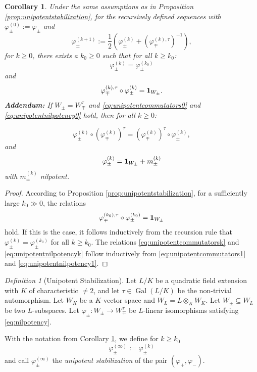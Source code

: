 \documentclass[a4paper,12pt,reqno]{amsart}
\DeclareMathOperator{\Gal}{\mathrm {Gal}}
\theoremstyle{plain}
\newtheorem{corollary}[theorem]{Corollary}
\theoremstyle{remark}
\newtheorem{definition}[theorem]{Definition}
\begin{document}
    \begin{corollary}\label{cor:unipotentstabilization}
      Under the same assumptions as in Proposition \ref{prop:unipotentstabilization}, for the recursively defined sequences with $\varphi^{(0)}_\pm := \varphi_\pm$ and
      \begin{equation}
        \varphi^{(k+1)}_\pm := \frac{1}{2}\left(\varphi_\pm^{(k)}+\left(\varphi_\mp^{(k),\tau}\right)^{-1}\right),
      \end{equation}
      for $k \ge 0$, there exists a $k_0 \ge 0$ such that for all $k \ge k_0$:
      \[
      \varphi_\pm^{(k)}=\varphi_{\pm}^{(k_0)}\]
      and
      \begin{equation}
        \varphi_\mp^{(k),\tau}\circ\varphi_\pm^{(k)}={\bf1}_{W_\pm}.
        \label{eq:conjugateinverse}
      \end{equation}
      \noindent\textbf{Addendum:} If $W_\pm = W_\mp^\tau$ and \eqref{eq:unipotentcommutators0} and \eqref{eq:unipotentnilpotency0} hold, then for all $k \ge 0$:
      
      \begin{equation}
      \varphi_\pm^{(k)}\circ\left(\varphi_\mp^{(k)}\right)^\tau=\left(\varphi_\mp^{(k)}\right)^\tau\circ\varphi_{\pm}^{(k)},
        \label{eq:unipotentcommutatorsk}
      \end{equation}
      and
      \begin{equation}
        \varphi_{\pm}^{(k)}={\bf1}_{W_\pm}+m_\pm^{(k)}
        \label{eq:unipotentnilpotencyk}
      \end{equation}
      with $m_\pm^{(k)}$ nilpotent.
    \end{corollary}

    \begin{proof}
      According to Proposition \ref{prop:unipotentstabilization}, for a sufficiently large $k_0 \gg 0$, the relations
      \[
      \varphi_\mp^{(k_0),\tau}\circ\varphi_\pm^{(k_0)}={\bf1}_{W_\pm}
      \]
      hold. If this is the case, it follows inductively from the recursion rule that $\varphi_\pm^{(k)} = \varphi_{\pm}^{(k_0)}$ for all $k \ge k_0$. The relations \eqref{eq:unipotentcommutatorsk} and \eqref{eq:unipotentnilpotencyk} follow inductively from \eqref{eq:unipotentcommutators1} and \eqref{eq:unipotentnilpotency1}.
    \end{proof}

    \begin{definition}[Unipotent Stabilization]\label{def:unipotentstabilization}
      Let $L/K$ be a quadratic field extension with $K$ of characteristic $\neq 2$, and let $\tau \in \Gal(L/K)$ be the non-trivial automorphism. Let $W_K$ be a $K$-vector space and $W_L = L \otimes_K W_K$. Let $W_\pm \subseteq W_L$ be two $L$-subspaces. Let $\varphi_\pm \colon W_\pm \to W_\mp^\tau$ be $L$-linear isomorphisms satisfying \eqref{eq:nilpotency}.

      With the notation from Corollary \ref{cor:unipotentstabilization}, we define for $k \ge k_0$
      \[
        \varphi^{(\infty)}_\pm:=\varphi^{(k)}_\pm
      \]
      and call $\varphi^{(\infty)}_\pm$ the {\em unipotent stabilization} of the pair $(\varphi_+, \varphi_-)$.
    \end{definition}
\end{document}

